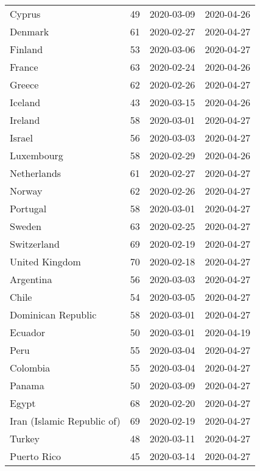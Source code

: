 \begin{longtable}{llll}
                     Cyprus &  49 & 2020-03-09 & 2020-04-26 \\
                    Denmark &  61 & 2020-02-27 & 2020-04-27 \\
                    Finland &  53 & 2020-03-06 & 2020-04-27 \\
                     France &  63 & 2020-02-24 & 2020-04-26 \\
                     Greece &  62 & 2020-02-26 & 2020-04-27 \\
                    Iceland &  43 & 2020-03-15 & 2020-04-26 \\
                    Ireland &  58 & 2020-03-01 & 2020-04-27 \\
                     Israel &  56 & 2020-03-03 & 2020-04-27 \\
                 Luxembourg &  58 & 2020-02-29 & 2020-04-26 \\
                Netherlands &  61 & 2020-02-27 & 2020-04-27 \\
                     Norway &  62 & 2020-02-26 & 2020-04-27 \\
                   Portugal &  58 & 2020-03-01 & 2020-04-27 \\
                     Sweden &  63 & 2020-02-25 & 2020-04-27 \\
                Switzerland &  69 & 2020-02-19 & 2020-04-27 \\
             United Kingdom &  70 & 2020-02-18 & 2020-04-27 \\
                  Argentina &  56 & 2020-03-03 & 2020-04-27 \\
                      Chile &  54 & 2020-03-05 & 2020-04-27 \\
         Dominican Republic &  58 & 2020-03-01 & 2020-04-27 \\
                    Ecuador &  50 & 2020-03-01 & 2020-04-19 \\
                       Peru &  55 & 2020-03-04 & 2020-04-27 \\
                   Colombia &  55 & 2020-03-04 & 2020-04-27 \\
                     Panama &  50 & 2020-03-09 & 2020-04-27 \\
                      Egypt &  68 & 2020-02-20 & 2020-04-27 \\
 Iran (Islamic Republic of) &  69 & 2020-02-19 & 2020-04-27 \\
                     Turkey &  48 & 2020-03-11 & 2020-04-27 \\
                Puerto Rico &  45 & 2020-03-14 & 2020-04-27 \\

\end{longtable}
